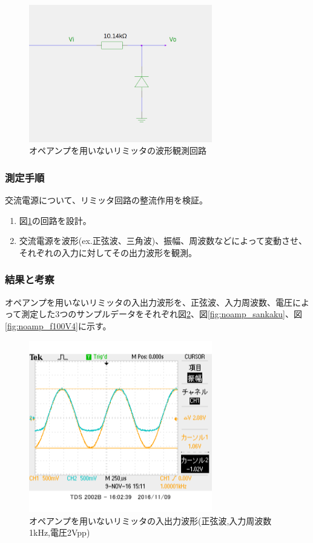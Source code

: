 \documentclass[11pt,a4j]{jsarticle}
\begin{document}
    \begin{figure}[htbp]
  \centering
  \includegraphics[width=8cm,clip]{noamp_wave.png}
  \caption{オペアンプを用いないリミッタの波形観測回路}
  \label{fig:noamp_wave}
 \end{figure}%
    
   \subsubsection{測定手順}
    交流電源について、リミッタ回路の整流作用を検証。
    \begin{enumerate}
    \item 図\ref{fig:noamp_wave}の回路を設計。
    \item 交流電源を波形(ex.正弦波、三角波)、振幅、周波数などによって変動させ、それぞれの入力に対してその出力波形を観測。
    \end{enumerate}
    
   \subsubsection{結果と考察} \label{sec:noamp_wave}
    
    オペアンプを用いないリミッタの入出力波形を、正弦波、入力周波数、電圧によって測定した3つのサンプルデータをそれぞれ図\ref{fig:noamp_f1V2}、図\ref{fig:noamp_sankaku}、図\ref{fig:noamp_f100V4}に示す。
    
    
    \begin{figure}[htbp]
  \centering
  \includegraphics[width=8cm,clip]{1_1_noampFG_f1V2_ViVo.png}
  \caption{オペアンプを用いないリミッタの入出力波形(正弦波,入力周波数1kHz,電圧2Vpp)}
  \label{fig:noamp_f1V2}
 \end{figure}%
 
\end{document}
